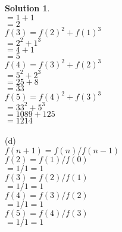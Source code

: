 \documentclass{article}
\theoremstyle{definition}
\newtheorem*{solution}{Solution}
\begin{document}
\begin{solution}
\\$=1 + 1$
\\$=2$
\\$f(3)=f(2)^2 + f(1)^3$
\\$=2^2 + 1^3$
\\$=4 + 1$
\\$=5$
\\$f(4)=f(3)^2 + f(2)^3$
\\$=5^2 + 2^3$
\\$=25 + 8$
\\$=33$
\\$f(5)=f(4)^2 + f(3)^3$
\\$=33^2 + 5^3$
\\$=1089 + 125$
\\$=1214$
\\
\\(d)
\\$f(n+1)=f(n)/f(n-1)$
\\$f(2)=f(1)/f(0)$
\\$= 1/1 = 1$
\\$f(3)=f(2)/f(1)$
\\$= 1/1 = 1$
\\$f(4)=f(3)/f(2)$
\\$= 1/1 = 1$
\\$f(5)=f(4)/f(3)$
\\$= 1/1 = 1$
\end{solution}
\end{document}
